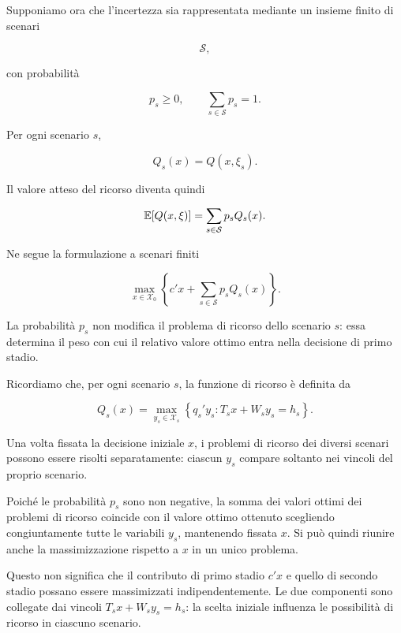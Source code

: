 Supponiamo ora che l'incertezza sia rappresentata mediante un insieme finito
di scenari

\[
\mathcal S,
\]

\noindent con probabilit\`a

\[
p_s\geq0,
\qquad
\sum_{s\in\mathcal S}p_s=1.
\]

Per ogni scenario $s$,

\[
Q_s(x)=Q(x,\xi_s).
\]

Il valore atteso del ricorso diventa quindi

\[
\mathbb{E}[Q(x,\xi)]
=
\sum_{s\in\mathcal S}p_s Q_s(x).
\]

Ne segue la formulazione a scenari finiti

\begin{equation}
\max_{x\in\mathcal X_0}
\left\{
c'x+
\sum_{s\in\mathcal S}p_s Q_s(x)
\right\}.
\label{eq:cap14-programma-stocastico-scenari}
\end{equation}

La probabilit\`a $p_s$ non modifica il problema di ricorso dello scenario
$s$: essa determina il peso con cui il relativo valore ottimo entra nella
decisione di primo stadio.





Ricordiamo che, per ogni scenario $s$, la funzione di
ricorso \`{e} definita da

\[
Q_s(x)
=
\max_{y_s\in\mathcal X_s}
\left\{
q_s'y_s:
T_sx+W_sy_s=h_s
\right\}.
\]

Una volta fissata la decisione iniziale $x$, i problemi
di ricorso dei diversi scenari possono essere risolti
separatamente: ciascun $y_s$ compare soltanto nei vincoli
del proprio scenario.

Poich\'{e} le probabilit\`{a} $p_s$ sono non negative,
la somma dei valori ottimi dei problemi di ricorso
coincide con il valore ottimo ottenuto scegliendo
congiuntamente tutte le variabili $y_s$, mantenendo
fissata $x$. Si pu\`{o} quindi riunire anche la
massimizzazione rispetto a $x$ in un unico problema.

Questo non significa che il contributo di primo stadio
$c'x$ e quello di secondo stadio possano essere
massimizzati indipendentemente. Le due componenti
sono collegate dai vincoli
$T_sx+W_sy_s=h_s$: la scelta iniziale influenza
le possibilit\`{a} di ricorso in ciascuno scenario.

